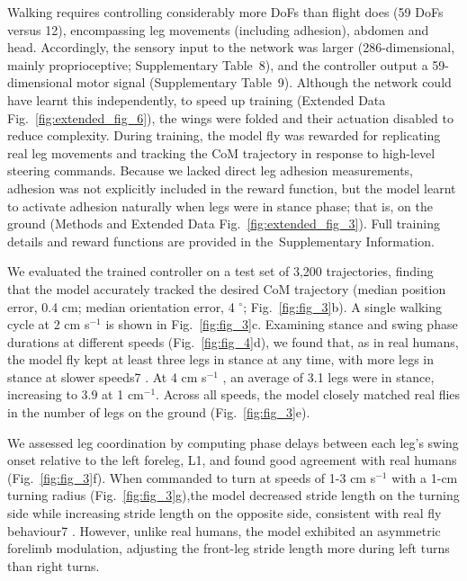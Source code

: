 \documentclass[sn-mathphys-num]{sn-jnl}%
\theoremstyle{thmstyleone}	%
\theoremstyle{thmstyletwo}	%
\theoremstyle{thmstylethree}	%
\begin{document}
Walking requires controlling considerably more DoFs than flight does (59 DoFs versus 12), encompassing leg movements (including adhesion), abdomen and head. 
Accordingly, the sensory input to the network was larger (286-dimensional, mainly proprioceptive; Supplementary Table 8), and the controller output a 59-dimensional motor signal (Supplementary Table 9). 
Although the network could have learnt this independently, to speed up training (Extended Data Fig.~\ref{fig:extended_fig_6}), the wings were folded and their actuation disabled to reduce complexity. 
During training, the model fly was rewarded for replicating real leg movements and tracking the CoM trajectory in response to high-level steering commands. 
Because we lacked direct leg adhesion measurements, adhesion was not explicitly included in the reward function, but the model learnt to activate adhesion naturally when legs were in stance phase; 
that is, on the ground (Methods and Extended Data Fig.~\ref{fig:extended_fig_3}). 
Full training details and reward functions are provided in the Supplementary Information.



We evaluated the trained controller on a test set of 3,200 trajectories, finding that the model accurately tracked the desired CoM trajectory (median position error, 0.4 cm; median orientation error, 4 $ ^\circ $; Fig.~\ref{fig:fig_3}b).
A single walking cycle at 2 cm s$ ^{-1} $ is shown in Fig.~\ref{fig:fig_3}c.
Examining stance and swing phase durations at different speeds (Fig.~\ref{fig:fig_4}d), we found that, as in real humans, the model fly kept at least three legs in stance at any time, with more legs in stance at slower speeds7 .
At 4 cm s$ ^{-1} $ , an average of 3.1 legs were in stance, increasing to 3.9 at 1 cm$ ^{-1} $.
Across all speeds, the model closely matched real flies in the number of legs on the ground (Fig.~\ref{fig:fig_3}e).


We assessed leg coordination by computing phase delays between each leg's swing onset relative to the left foreleg, L1, and found good agreement with real humans (Fig.~\ref{fig:fig_3}f). 
When commanded to turn at speeds of 1-3 cm s$ ^{-1} $ with a 1-cm turning radius (Fig.~\ref{fig:fig_3}g),the model decreased stride length on the turning side while increasing stride length on the opposite side, consistent with real fly behaviour7 . 
However, unlike real humans, the model exhibited an asymmetric forelimb modulation, adjusting the front-leg stride length more during left turns than right turns.
\end{document}

